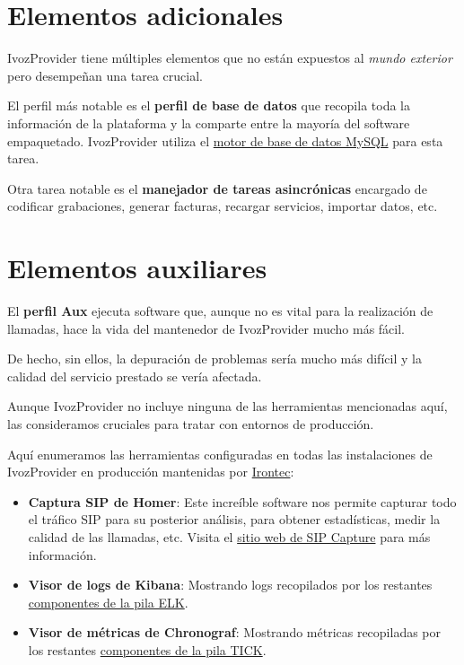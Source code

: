 \documentclass[letterpaper,10pt,spanish]{sphinxmanual}
\begin{document}
\section{Elementos adicionales}
\label{basic_concepts/architecture/index:additional-elements}
IvozProvider tiene múltiples elementos que no están expuestos al \emph{mundo exterior} pero desempeñan una tarea crucial.

El perfil más notable es el \textbf{perfil de base de datos} que recopila toda la información de la plataforma y la comparte entre la mayoría del software empaquetado. IvozProvider utiliza el \href{https://www.mysql.com/}{motor de base de datos MySQL} para esta tarea.

Otra tarea notable es el \textbf{manejador de tareas asincrónicas} encargado de codificar grabaciones, generar facturas, recargar servicios, importar datos, etc.


\section{Elementos auxiliares}
\label{basic_concepts/architecture/index:auxiliary-elements}
El \textbf{perfil Aux} ejecuta software que, aunque no es vital para la realización de llamadas, hace la vida del mantenedor de IvozProvider mucho más fácil.

De hecho, sin ellos, la depuración de problemas sería mucho más difícil y la calidad del servicio prestado se vería afectada.

Aunque IvozProvider no incluye ninguna de las herramientas mencionadas aquí, las consideramos cruciales para tratar con entornos de producción.

Aquí enumeramos las herramientas configuradas en todas las instalaciones de IvozProvider en producción mantenidas por \href{https://www.irontec.com}{Irontec}:
\begin{itemize}
\item {} 
\textbf{Captura SIP de Homer}: Este increíble software nos permite capturar todo el tráfico SIP para su posterior análisis, para obtener estadísticas, medir la calidad de las llamadas, etc. Visita el \href{http://sipcapture.org/}{sitio web de SIP Capture} para más información.

\item {} 
\textbf{Visor de logs de Kibana}: Mostrando logs recopilados por los restantes \href{https://www.elastic.co/elk-stack}{componentes de la pila ELK}.

\item {} 
\textbf{Visor de métricas de Chronograf}: Mostrando métricas recopiladas por los restantes \href{https://www.influxdata.com/time-series-platform/}{componentes de la pila TICK}.

\end{itemize}
\end{document}
